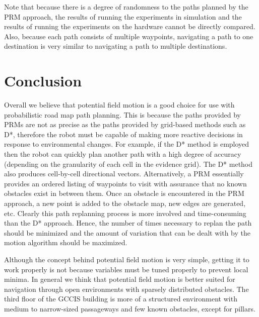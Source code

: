 \documentclass[12pt]{article}
\begin{document}
Note that because there is a degree of randomness to the paths planned by the PRM approach, the results of running the experiments in simulation and the results of running the experiments on the hardware cannot be directly compared. Also, because each path consists of multiple waypoints, navigating a path to one destination is very similar to navigating a path to multiple destinations.


\section{Conclusion}

Overall we believe that potential field motion is a good choice for use with probabilistic road map path planning. This is because the paths provided by PRMs are not as precise as the paths provided by grid-based methods such as D*, therefore the robot must be capable of making more reactive decisions in response to environmental changes. For example, if the D* method is employed then the robot can quickly plan another path with a high degree of accuracy (depending on the granularity of each cell in the evidence grid). The D* method also produces cell-by-cell directional vectors. Alternatively, a PRM essentially provides an ordered listing of waypoints to visit with assurance that no known obstacles exist in between them. Once an obstacle is encountered in the PRM approach, a new point is added to the obstacle map, new edges are generated, etc. Clearly this path replanning process is more involved and time-consuming than the D* approach. Hence, the number of times necessary to replan the path should be minimized and the amount of variation that can be dealt with by the motion algorithm should be maximized.

Although the concept behind potential field motion is very simple, getting it to work properly is not because variables must be tuned properly to prevent local minima. In general we think that potential field motion is better suited for navigation through open environments with sparsely distributed obstacles. The third floor of the GCCIS building is more of a structured environment with medium to narrow-sized passageways and few known obstacles, except for pillars. 
\end{document}
